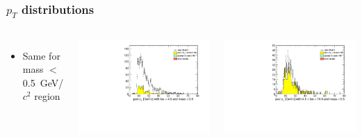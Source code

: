 \documentclass[compress]{beamer}
\begin{document}
\begin{frame}
\frametitle{$p_T$ distributions}
\begin{columns}
\begin{itemize}
\item Same for mass $<$ 0.5~GeV/$c^2$ region
\end{itemize}

\includegraphics[width=\linewidth]{lowdimuon_pt_lowmass_isolated.pdf}

\includegraphics[width=\linewidth]{lowdimuon_pt_lowmass_isosideband.pdf}


\end{columns}
\end{frame}
\end{document}
